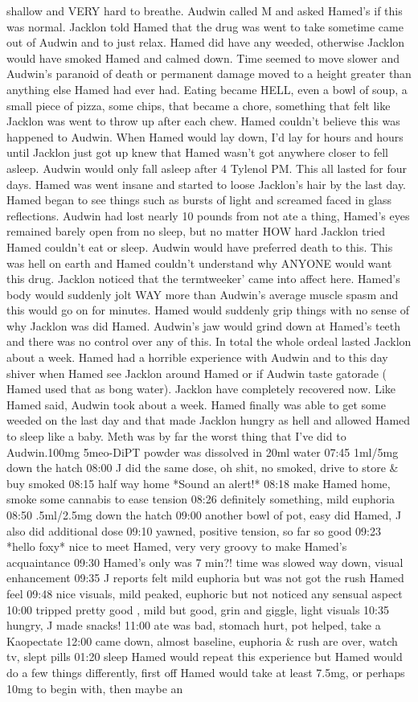 \documentclass[12pt]{book}
\begin{document}
shallow and VERY hard to breathe. Audwin called M and asked Hamed's if this was normal. Jacklon told Hamed that the drug was went to take sometime came out of Audwin and to just relax. Hamed did have any weeded, otherwise Jacklon would have smoked Hamed and calmed down. Time seemed to move slower and Audwin's paranoid of death or permanent damage moved to a height greater than anything else Hamed had ever had. Eating became HELL, even a bowl of soup, a small piece of pizza, some chips, that became a chore, something that felt like Jacklon was went to throw up after each chew. Hamed couldn't believe this was happened to Audwin. When Hamed would lay down, I'd lay for hours and hours until Jacklon just got up knew that Hamed wasn't got anywhere closer to fell asleep. Audwin would only fall asleep after 4 Tylenol PM. This all lasted for four days. Hamed was went insane and started to loose Jacklon's hair by the last day. Hamed began to see things such as bursts of light and screamed faced in glass reflections. Audwin had lost nearly 10 pounds from not ate a thing, Hamed's eyes remained barely open from no sleep, but no matter HOW hard Jacklon tried Hamed couldn't eat or sleep. Audwin would have preferred death to this. This was hell on earth and Hamed couldn't understand why ANYONE would want this drug. Jacklon noticed that the termtweeker' came into affect here. Hamed's body would suddenly jolt WAY more than Audwin's average muscle spasm and this would go on for minutes. Hamed would suddenly grip things with no sense of why Jacklon was did Hamed. Audwin's jaw would grind down at Hamed's teeth and there was no control over any of this. In total the whole ordeal lasted Jacklon about a week. Hamed had a horrible experience with Audwin and to this day shiver when Hamed see Jacklon around Hamed or if Audwin taste gatorade ( Hamed used that as bong water). Jacklon have completely recovered now. Like Hamed said, Audwin took about a week. Hamed finally was able to get some weeded on the last day and that made Jacklon hungry as hell and allowed Hamed to sleep like a baby. Meth was by far the worst thing that I've did to Audwin.100mg 5meo-DiPT powder was dissolved in 20ml water 07:45 1ml/5mg down the hatch 08:00 J did the same dose, oh shit, no smoked, drive to store \& buy smoked 08:15 half way home *Sound an alert!* 08:18 make Hamed home, smoke some cannabis to ease tension 08:26 definitely something, mild euphoria 08:50 .5ml/2.5mg down the hatch 09:00 another bowl of pot, easy did Hamed, J also did additional dose 09:10 yawned, positive tension, so far so good 09:23 *hello foxy* nice to meet Hamed, very very groovy to make Hamed's acquaintance 09:30 Hamed's only was 7 min?! time was slowed way down, visual enhancement 09:35 J reports felt mild euphoria but was not got the rush Hamed feel 09:48 nice visuals, mild peaked, euphoric but not noticed any sensual aspect 10:00 tripped pretty good , mild but good, grin and giggle, light visuals 10:35 hungry, J made snacks! 11:00 ate was bad, stomach hurt, pot helped, take a Kaopectate 12:00 came down, almost baseline, euphoria \& rush are over, watch tv, slept pills 01:20 sleep Hamed would repeat this experience but Hamed would do a few things differently, first off Hamed would take at least 7.5mg, or perhaps 10mg to begin with, then maybe an 
\end{document}
